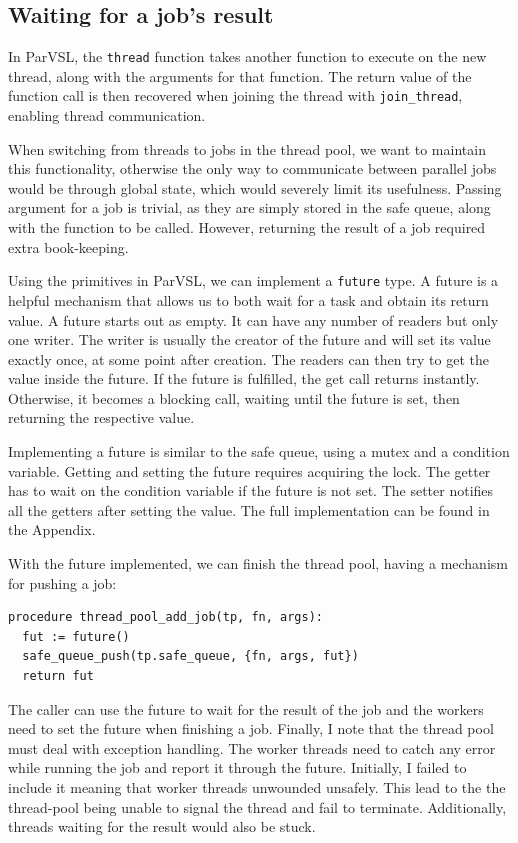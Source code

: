 \subsection{Waiting for a job's result}

In ParVSL, the \texttt{thread} function takes another function to execute on the new thread,
along with the arguments for that function. The return value of the function call is
then recovered when joining the thread with \texttt{join\_thread}, enabling thread communication.

When switching from threads to jobs in the thread pool, we want to maintain this functionality,
otherwise the only way to communicate between parallel jobs would be through global state,
which would severely limit its usefulness. Passing argument for a job is trivial, as they are simply
stored in the safe queue, along with the function to be called. However, returning the result of
a job required extra book-keeping.

Using the primitives in ParVSL, we can implement a \texttt{future} type. A future is a helpful mechanism
that allows us to both wait for a task and obtain its return value. A future starts out as empty.
It can have any number of readers but only one writer. The writer is usually the creator of the future
and will set its value exactly once, at some point after creation. The readers can then try to get the
value inside the future. If the future is fulfilled, the get call returns instantly. Otherwise, it
becomes a blocking call, waiting until the future is set, then returning the respective value.

Implementing a future is similar to the safe queue, using a mutex and a condition variable.
Getting and setting the future requires acquiring the lock. The getter has to wait on the condition
variable if the future is not set. The setter notifies all the getters after setting the value.
The full implementation can be found in the Appendix.

With the future implemented, we can finish the thread pool, having a mechanism for pushing a job:

\begin{verbatim}
procedure thread_pool_add_job(tp, fn, args):
  fut := future()
  safe_queue_push(tp.safe_queue, {fn, args, fut})
  return fut
\end{verbatim}

The caller can use the future to wait for the result of the job and the workers need to set the future
when finishing a job. Finally, I note that the thread pool must deal with exception handling. The worker threads
need to catch any error while running the job and report it through the future. Initially, I failed to include
it meaning that worker threads unwounded unsafely. This lead to the the thread-pool being unable to signal the
thread and fail to terminate. Additionally, threads waiting for the result would also be stuck.

